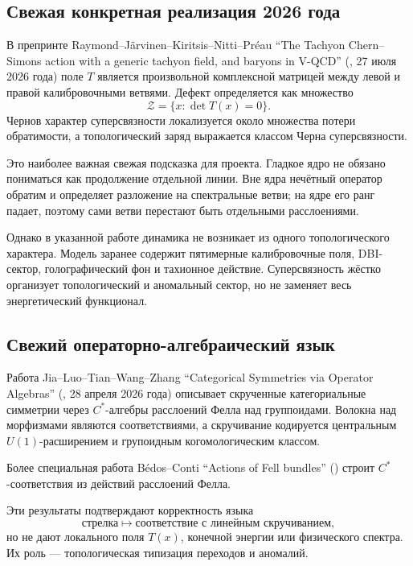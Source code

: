 \subsection{Свежая конкретная реализация 2026 года}

В препринте Raymond--Järvinen--Kiritsis--Nitti--Préau
``The Tachyon Chern--Simons action with a generic tachyon field, and
baryons in V-QCD'' (, 27 июля 2026 года) поле $T$
является произвольной комплексной матрицей между левой и правой
калибровочными ветвями. Дефект определяется как множество
\begin{equation}
 \mathcal Z=\{x:\det T(x)=0\}.
 \label{eq:v5-literature-noninvertibility-locus}
\end{equation}
Чернов характер суперсвязности локализуется около множества потери
обратимости, а топологический заряд выражается классом Черна
суперсвязности.

Это наиболее важная свежая подсказка для проекта. Гладкое ядро не обязано
пониматься как продолжение отдельной линии. Вне ядра нечётный оператор
обратим и определяет разложение на спектральные ветви; на ядре его ранг
падает, поэтому сами ветви перестают быть отдельными расслоениями.

Однако в указанной работе динамика не возникает из одного топологического
характера. Модель заранее содержит пятимерные калибровочные поля,
DBI-сектор, голографический фон и тахионное действие. Суперсвязность
жёстко организует топологический и аномальный сектор, но не заменяет весь
энергетический функционал.

\subsection{Свежий операторно-алгебраический язык}

Работа Jia--Luo--Tian--Wang--Zhang ``Categorical Symmetries via Operator
Algebras'' (, 28 апреля 2026 года) описывает
скрученные категориальные симметрии через $C^*$-алгебры расслоений Фелла
над группоидами. Волокна над морфизмами являются соответствиями, а
скручивание кодируется центральным $U(1)$-расширением и групоидным
когомологическим классом.

Более специальная работа Bédos--Conti ``Actions of Fell bundles''
() строит $C^*$-соответствия из действий расслоений
Фелла.

Эти результаты подтверждают корректность языка
\begin{equation}
 \text{стрелка}\longmapsto\text{соответствие с линейным скручиванием},
\end{equation}
но не дают локального поля $T(x)$, конечной энергии или физического
спектра. Их роль --- топологическая типизация переходов и аномалий.

